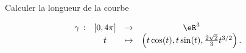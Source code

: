 \begin{exercice}\label{exoGeomAnal-0029}

Calculer la longueur de la courbe 

\begin{equation}
  \begin{array}{rccc}
    \gamma\, :& [0,4\pi] & \to &\eR^3 \\
     & t & \mapsto & \left(t\cos(t), t\sin(t), \frac{2\sqrt{2}}{3} t^{3/2}\right).
  \end{array}
  \end{equation}


\end{exercice}
